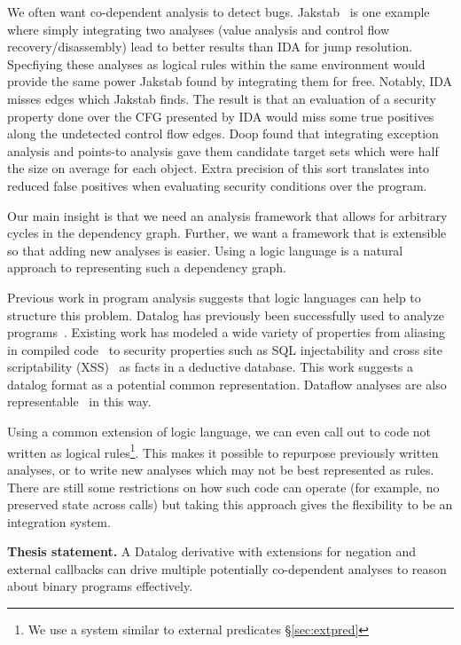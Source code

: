 We often want co-dependent analysis to detect bugs.
Jakstab~\cite{jakstab} is one example where simply integrating two analyses (value analysis and control flow recovery/disassembly) lead to better results than IDA\cite{ida} for jump resolution.
Specfiying these analyses as logical rules within the same environment would provide the same power Jakstab found by integrating them for free.
Notably, IDA misses edges which Jakstab finds.
The result is that an evaluation of a security property done over the CFG presented by IDA would miss some true positives along the undetected control flow edges.
Doop\cite{doop1} found that integrating exception analysis and points-to analysis gave them candidate target sets which were half the size on average for each object.
Extra precision of this sort translates into reduced false positives when evaluating security conditions over the program.

Our main insight is that we need an analysis framework that allows for arbitrary cycles in the dependency graph.
Further, we want a framework that is extensible so that adding new analyses is easier.
Using a logic language is a natural approach to representing such a dependency graph.

Previous work in program analysis suggests that logic languages can help to structure this problem.
Datalog has previously been successfully used to analyze programs~\cite{lam2005,brumley2006,alpuente2011,doop1,bddbddb}.
Existing work has modeled a wide variety of properties from aliasing in compiled code~\cite{brumley2006} to security properties such as SQL injectability and cross site scriptability (XSS)~\cite{lam2005} as facts in a deductive database.
This work suggests a datalog format as a potential common representation.
Dataflow analyses are also representable~\cite{mcallester2002} in this way.

Using a common extension of logic language, we can even call out to code not written as logical rules\footnote{We use a system similar to external predicates \S\ref{sec:extpred}}.
This makes it possible to repurpose previously written analyses, or to write new analyses which may not be best represented as rules.
There are still some restrictions on how such code can operate (for example, no preserved state across calls) but taking this approach gives the flexibility to be an integration system.

\begin{inset}
{\bf Thesis statement.}
A Datalog derivative with extensions for negation and external callbacks can drive multiple potentially co-dependent analyses to reason about binary programs effectively.
\end{inset}

